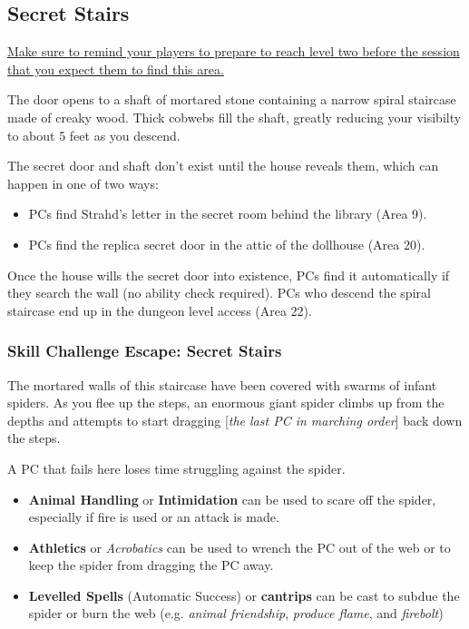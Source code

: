 \begin{arealinks}
\end{arealinks}


\pagebreak
\subsection{Secret Stairs}
\label{sec:SecretStairs}
\uline{Make sure to remind your players to prepare to reach level two before the session that you expect
them to find this area.}
\begin{readout}
  The door opens to a shaft of mortared stone containing a narrow spiral staircase made of creaky wood.
  Thick cobwebs fill the shaft, greatly reducing your visibilty to about 5 feet as you descend.
\end{readout}
The secret door and shaft don't exist until the house reveals them, which can happen in one of two ways:
\begin{itemize}
  \item PCs find Strahd's letter in the secret room behind the library (Area 9).
  \item PCs find the replica secret door in the attic of the dollhouse (Area 20).
\end{itemize}
Once the house wills the secret door into existence, PCs find it automatically if they search the wall
(no ability check required). PCs who descend the spiral staircase end up in the dungeon level access (Area 22).

\begin{arealinks}
\end{arealinks}

\subsubsection*{Skill Challenge Escape: Secret Stairs}
\label{sec:SC_SecretStaircase}
\begin{readout}
  The mortared walls of this staircase have been covered with swarms of infant spiders. As you flee up the
  steps, an enormous giant spider climbs up from the depths and attempts to start dragging [\textit{the last
  PC in marching order}] back down the steps.
\end{readout}
A PC that fails here loses time struggling against the spider.
\begin{skillChallenge}
  \begin{itemize}
    \item \textbf{Animal Handling} or \textbf{Intimidation} can be used to scare off the spider, especially if
    fire is used or an attack is made. \moderateDC
    \item \textbf{Athletics} or \textit{Acrobatics} can be used to wrench the PC out of the web or to keep the 
    spider from dragging the PC away. \moderateDC
    \item \textbf{Levelled Spells} (Automatic Success) or \textbf{cantrips} \easyDC can be cast to subdue the
    spider or burn the web (e.g. \textit{animal friendship}, \textit{produce flame}, and \textit{firebolt})
  \end{itemize}
\end{skillChallenge}
